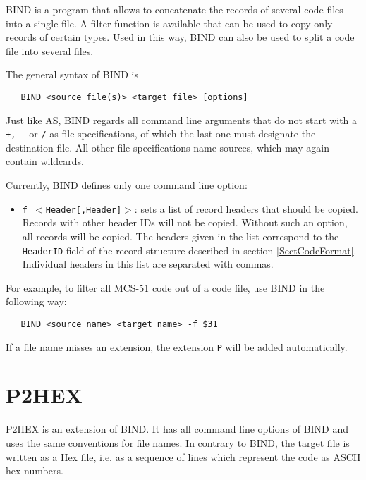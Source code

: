 \documentclass[12pt,twoside]{report}
\newcommand{\tty}[1]{{\tt #1}}
\begin{document}
BIND is a program that allows to concatenate the records of several
code files into a single file.  A filter function is available that
can be used to copy only records of certain types.  Used in this way,
BIND can also be used to split a code file into several files.

The general syntax of BIND is
\begin{verbatim}
   BIND <source file(s)> <target file> [options]
\end{verbatim}
Just like AS, BIND regards all command line arguments that do not
start with a \tty{+, -} or \tty{/} as file specifications, of which the last one
must designate the destination file.  All other file specifications
name sources, which may again contain wildcards.

Currently, BIND defines only one command line option:
\begin{itemize}
\item{\tty{f $<$Header[,Header]$>$}: sets a list of record headers that should
      be copied.  Records with other header IDs will
      not be copied.  Without such an option, all
      records will be copied.  The headers given in
      the list correspond to the \tty{HeaderID} field of the
      record structure described in section \ref{SectCodeFormat}.
      Individual headers in this list are separated
      with commas.}
\end{itemize}
For example, to filter all MCS-51 code out of a code file, use BIND
in the following way:
\begin{verbatim}
   BIND <source name> <target name> -f $31
\end{verbatim}
If a file name misses an extension, the extension \tty{P} will be added
automatically.


\section{P2HEX}

P2HEX is an extension of BIND.  It has all command line options of BIND and
uses the same conventions for file names.  In contrary to BIND, the
target file is written as a Hex file, i.e. as a sequence of lines
which represent the code as ASCII hex numbers.
\end{document}
